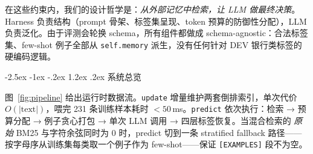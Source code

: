 \documentclass[11pt]{article}
\makeatletter
\renewcommand\section{\@startsection {section}{1}{\z@}%
  {-2.5ex \@plus -1ex \@minus -.2ex}%
  {1.2ex \@plus.2ex}%
  {\color{rule}\normalfont\large\bfseries}}
\makeatother
\begin{document}
在这些约束内，我们的设计哲学是：\emph{从外部记忆中检索，让 LLM 做最终决策}。Harness 负责结构（prompt 骨架、标签集呈现、token 预算的防御性分配），LLM 负责泛化。由于评测会轮换 schema，所有组件都做成 schema-agnostic：合法标签集、few-shot 例子全部从 \texttt{self.memory} 派生，没有任何针对 DEV 银行类标签的硬编码逻辑。

\section{系统总览}

图~\ref{fig:pipeline} 给出运行时数据流。\texttt{update} 增量维护两套倒排索引，单次代价 $O(|\text{text}|)$，喂完 231 条训练样本耗时 $<\!50$\,ms。\texttt{predict} 依次执行：检索 → 预算分配 → 例子贪心打包 → 单次 LLM 调用 → 四层标签恢复。当混合检索的 \emph{原始} BM25 与字符余弦同时为 0 时，predict 切到一条 stratified fallback 路径——按字母序从训练集每类取一个例子作为 few-shot——保证 \texttt{[EXAMPLES]} 段不为空。
\end{document}
